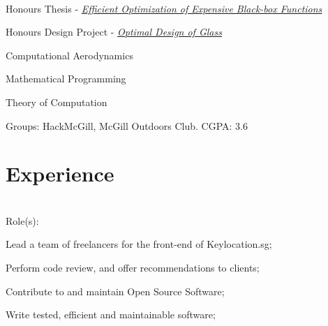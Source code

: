 \documentclass[letterpaper]{deedy-resume} %
\begin{document}
 \\

\begin{tightitemize}
\item Honours Thesis - \href{https://dl.dropboxusercontent.com/u/14503566/thesis.pdf}{\textit{Efficient Optimization of Expensive Black-box Functions}}

\item Honours Design Project - \href{https://dl.dropboxusercontent.com/u/14503566/thesis.pdf}{\textit{Optimal
Design of Glass}}
\end{tightitemize}

\insectionspace
{}
\begin{tightitemize}
\item Computational Aerodynamics
\item Mathematical Programming
\item Theory of Computation

\end{tightitemize}
\insectionspace

Groups: HackMcGill, McGill Outdoors Club. CGPA: 3.6

\sectionspace %


\section{Experience}



\\[\fpeval{\baseheight}]

Role(s):

\begin{tightitemize}
    \item Lead a team of freelancers for the front-end of Keylocation.sg;
    \item Perform code review, and offer recommendations to clients;
    \item Contribute to and maintain Open Source Software;
    \item Write tested, efficient and maintainable software;
\end{tightitemize}
\end{document}
